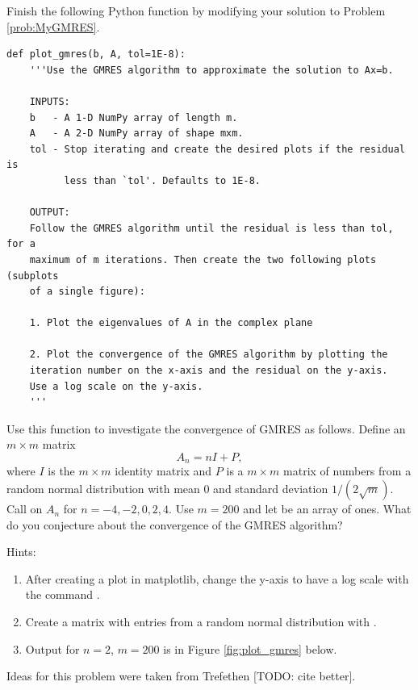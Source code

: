 \begin{problem}\label{prob:plot_gmres}
Finish the following Python function by modifying your solution to Problem \ref{prob:MyGMRES}.

\begin{lstlisting}
def plot_gmres(b, A, tol=1E-8):
    '''Use the GMRES algorithm to approximate the solution to Ax=b.
    
    INPUTS:
    b   - A 1-D NumPy array of length m.
    A   - A 2-D NumPy array of shape mxm.
    tol - Stop iterating and create the desired plots if the residual is
          less than `tol'. Defaults to 1E-8.
    
    OUTPUT:
    Follow the GMRES algorithm until the residual is less than tol, for a 
    maximum of m iterations. Then create the two following plots (subplots
    of a single figure):
     
    1. Plot the eigenvalues of A in the complex plane
    
    2. Plot the convergence of the GMRES algorithm by plotting the
    iteration number on the x-axis and the residual on the y-axis.
    Use a log scale on the y-axis.
    '''
\end{lstlisting}

Use this function to investigate the convergence of GMRES as follows. 
Define an $m\times m$ matrix
\[A_n = nI+P,\]
 where $I$ is the $m \times m$ identity matrix and $P$ is a $m \times m$ matrix of numbers from a random normal distribution with mean 0 and standard deviation $1/(2\sqrt{m})$. 
 Call  on $A_n$ for $n=-4,-2,0,2,4$. Use $m=200$ and let  be an array of ones. What do you conjecture about the convergence of the GMRES algorithm?
 
 Hints:
 \begin{enumerate}
 \item After creating a plot in matplotlib, change the y-axis to have a log scale with the command . 
 \item Create a matrix with entries from a random normal distribution with .
 \item Output for $n=2$, $m=200$ is in Figure \ref{fig:plot_gmres} below.
 \end{enumerate}
Ideas for this problem were taken from Trefethen [TODO: cite better].


\end{problem}
